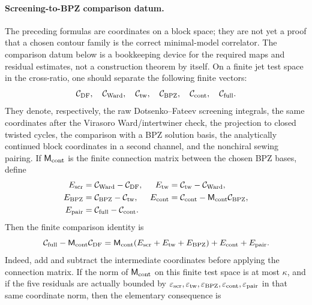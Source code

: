 \paragraph{Screening-to-BPZ comparison datum.}
The preceding formulas are coordinates on a block space; they are not yet a
proof that a chosen contour family is the correct minimal-model correlator.
The comparison datum below is a bookkeeping device for the required maps and
residual estimates, not a construction theorem by itself.  On a finite jet
test space in the cross-ratio, one should separate the following finite
vectors:
\[
  \mathcal C_{\rm DF},\quad
  \mathcal C_{\rm Ward},\quad
  \mathcal C_{\rm tw},\quad
  \mathcal C_{\rm BPZ},\quad
  \mathcal C_{\rm cont},\quad
  \mathcal C_{\rm full}.
\]
They denote, respectively, the raw Dotsenko--Fateev screening integrals, the
same coordinates after the Virasoro Ward/intertwiner check, the projection to
closed twisted cycles, the comparison with a BPZ solution basis, the analytically
continued block coordinates in a second channel, and the nonchiral sewing
pairing.  If \(\mathsf M_{\rm cont}\) is the finite connection matrix between
the chosen BPZ bases, define
\begin{align}
  E_{\rm scr}
  &=
  \mathcal C_{\rm Ward}-\mathcal C_{\rm DF},
  &
  E_{\rm tw}
  &=
  \mathcal C_{\rm tw}-\mathcal C_{\rm Ward},
  \label{eq:coulomb-gas-bpz-budget-a}\\
  E_{\rm BPZ}
  &=
  \mathcal C_{\rm BPZ}-\mathcal C_{\rm tw},
  &
  E_{\rm cont}
  &=
  \mathcal C_{\rm cont}-\mathsf M_{\rm cont}\mathcal C_{\rm BPZ},
  \label{eq:coulomb-gas-bpz-budget-b}\\
  E_{\rm pair}
  &=
  \mathcal C_{\rm full}-\mathcal C_{\rm cont}.
  \label{eq:coulomb-gas-bpz-budget-c}
\end{align}
Then the finite comparison identity is
\begin{equation}
  \mathcal C_{\rm full}-\mathsf M_{\rm cont}\mathcal C_{\rm DF}
  =
  \mathsf M_{\rm cont}
  (E_{\rm scr}+E_{\rm tw}+E_{\rm BPZ})
  +E_{\rm cont}+E_{\rm pair}.
  \label{eq:coulomb-gas-bpz-budget-telescope}
\end{equation}
Indeed, add and subtract the intermediate coordinates before applying the
connection matrix.  If the norm of \(\mathsf M_{\rm cont}\) on this finite test
space is at most \(\kappa\), and if the five residuals are actually bounded by
\(\varepsilon_{\rm scr},\varepsilon_{\rm tw},\varepsilon_{\rm BPZ},
\varepsilon_{\rm cont},\varepsilon_{\rm pair}\) in that same coordinate norm,
then the elementary consequence is
